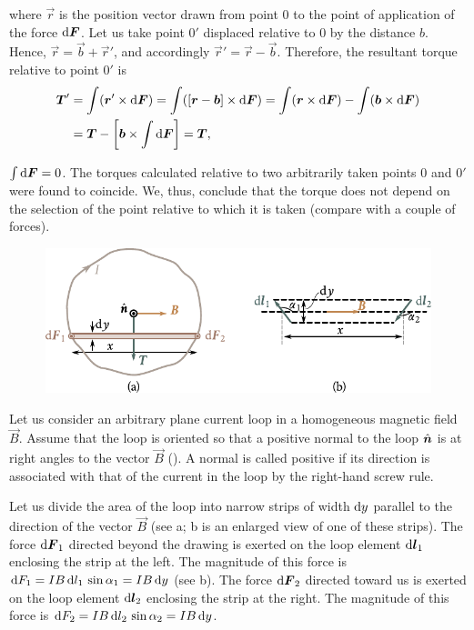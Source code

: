 \noindent
where $\vec{r}$ is the position vector drawn from point $0$ to the point of application of the force $\mathrm{d}\boldsymbol{F}$. Let us take point $0'$ displaced relative to $0$ by the distance $b$. Hence, $\vec{r}=\vec{b}+\vec{r}'$, and accordingly $\vec{r}'=\vec{r}-\vec{b}$. Therefore, the resultant torque relative to point $0'$ is
\begin{align*}
    \boldsymbol{T}' &=  \int (\boldsymbol{r}' \times \mathrm{d}\boldsymbol{F}) = \int ([\boldsymbol{r} - \boldsymbol{b}] \times \mathrm{d}\boldsymbol{F}) = \int (\boldsymbol{r} \times \mathrm{d}\boldsymbol{F}) - \int (\boldsymbol{b} \times \mathrm{d}\boldsymbol{F})\\
    &= \boldsymbol{T} - \left[ \boldsymbol{b} \times \int \mathrm{d}\boldsymbol{F} \right] = \boldsymbol{T},
\end{align*}

\noindent
$\int\mathrm{d}\boldsymbol{F}=0$. The torques calculated relative to two arbitrarily taken points $0$ and $0'$ were found to coincide. We, thus, conclude that the torque does not depend on the selection of the point relative to which it is taken (compare with a couple of forces).

\begin{figure}[t]
	\begin{center}
		\includegraphics[scale=1]{figures/ch_06/fig_6_14.pdf}
		\caption[]{}
		\label{fig:6_14}
	\end{center}
	\vspace{-0.8cm}
\end{figure}

Let us consider an arbitrary plane current loop in a homogeneous magnetic field $\vec{B}$. Assume that the loop is oriented so that a positive normal to the loop $\hat{\boldsymbol{n}}$ is at right angles to the vector $\vec{B}$ (). A normal is called positive if its direction is associated with that of the current in the loop by the right-hand screw rule.

Let us divide the area of the loop into narrow strips of width $\mathrm{d} y$ parallel to the direction of the vector $\vec{B}$ (see a; b is an enlarged view of one of these strips). The force $\mathrm{d}\boldsymbol{F}_1$ directed beyond the drawing is exerted on the loop element $\mathrm{d}\boldsymbol{l}_1$ enclosing the strip at the left. The magnitude of this force is $\mathrm{d} F_1 = IB\, \mathrm{d} l_1\, \sin\alpha_1 = IB\, \mathrm{d} y$ (see b).
The force $\mathrm{d}\boldsymbol{F}_2$ directed toward us is exerted on the loop element $\mathrm{d}\boldsymbol{l}_2$ enclosing the strip at the right. The magnitude of this force is $\mathrm{d} F_2 = IB\, \mathrm{d} l_2\, \sin\alpha_2 = IB\, \mathrm{d} y$.


